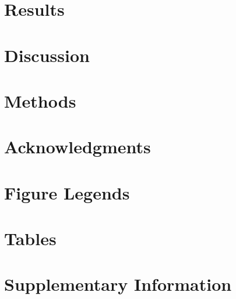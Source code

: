 \section{Results}


\section{Discussion}


\section{Methods}


\section{Acknowledgments}




\pagebreak
\section{Figure Legends}


\FloatBarrier

\section{Tables}



%


\FloatBarrier

\pagebreak
\setcounter{secnumdepth}{4}
\section{Supplementary Information}

%
%




